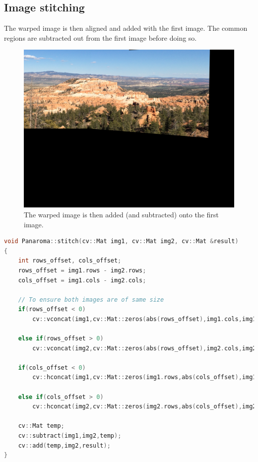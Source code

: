 \documentclass[a4paper,11]{article}
\begin{document}
  \subsection{Image stitching}
  
  The warped image is then aligned and added with the first image. The common regions are subtracted out from the first image before doing so.
  
    \begin{figure}[H]
    \centering
    \includegraphics[scale=0.2]{mosaic1}
    \caption{The warped image is then added (and subtracted) onto the first image.}
  \end{figure}
  
    \begin{lstlisting}[language=C++]
void Panaroma::stitch(cv::Mat img1, cv::Mat img2, cv::Mat &result)
{
	int rows_offset, cols_offset;
	rows_offset = img1.rows - img2.rows;
	cols_offset = img1.cols - img2.cols;
    
    // To ensure both images are of same size
	if(rows_offset < 0)
		cv::vconcat(img1,cv::Mat::zeros(abs(rows_offset),img1.cols,img1.type()),img1);
	
	else if(rows_offset > 0)
		cv::vconcat(img2,cv::Mat::zeros(abs(rows_offset),img2.cols,img2.type()),img2);

	if(cols_offset < 0)
		cv::hconcat(img1,cv::Mat::zeros(img1.rows,abs(cols_offset),img1.type()),img1);

	else if(cols_offset > 0)
		cv::hconcat(img2,cv::Mat::zeros(img2.rows,abs(cols_offset),img2.type()),img2);

	cv::Mat temp;
	cv::subtract(img1,img2,temp);
	cv::add(temp,img2,result);
}
    \end{lstlisting}
    \vspace{2em}
\end{document}
